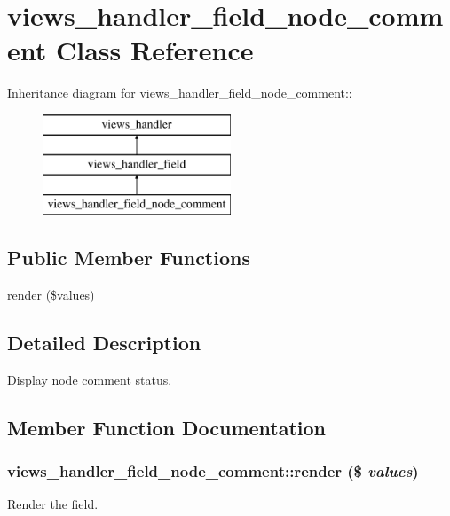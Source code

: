 \hypertarget{classviews__handler__field__node__comment}{
\section{views\_\-handler\_\-field\_\-node\_\-comment Class Reference}
\label{classviews__handler__field__node__comment}
}
Inheritance diagram for views\_\-handler\_\-field\_\-node\_\-comment::\begin{figure}[H]
\begin{center}
\leavevmode
\includegraphics[height=3cm]{classviews__handler__field__node__comment}
\end{center}
\end{figure}
\subsection*{Public Member Functions}
\begin{DoxyCompactItemize}
\item 
\hyperlink{classviews__handler__field__node__comment_a51cfcaea207e77a961a1bf40aba96737}{render} (\$values)
\end{DoxyCompactItemize}


\subsection{Detailed Description}
Display node comment status. 

\subsection{Member Function Documentation}
\hypertarget{classviews__handler__field__node__comment_a51cfcaea207e77a961a1bf40aba96737}{
\subsubsection[{render}]{\setlength{\rightskip}{0pt plus 5cm}views\_\-handler\_\-field\_\-node\_\-comment::render (\$ {\em values})}}
\label{classviews__handler__field__node__comment_a51cfcaea207e77a961a1bf40aba96737}
Render the field.



